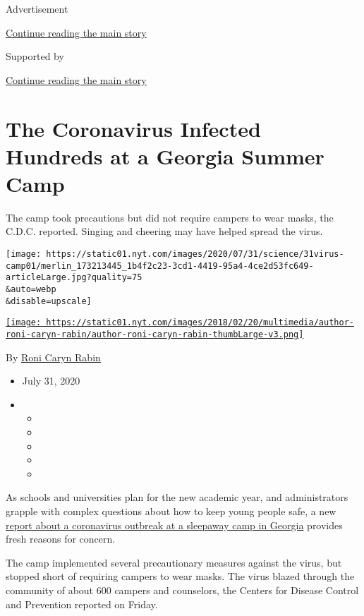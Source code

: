 Advertisement

\protect\hyperlink{after-top}{Continue reading the main story}

Supported by

\protect\hyperlink{after-sponsor}{Continue reading the main story}

\hypertarget{the-coronavirus-infected-hundreds-at-a-georgia-summer-camp}{%
\section{The Coronavirus Infected Hundreds at a Georgia Summer
Camp}\label{the-coronavirus-infected-hundreds-at-a-georgia-summer-camp}}

The camp took precautions but did not require campers to wear masks, the
C.D.C. reported. Singing and cheering may have helped spread the virus.

\texttt{[image: https://static01.nyt.com/images/2020/07/31/science/31virus-camp01/merlin\_173213445\_1b4f2c23-3cd1-4419-95a4-4ce2d53fc649-articleLarge.jpg?quality=75\\\&auto=webp\\\&disable=upscale]}

\href{https://www.nytimes.com/by/roni-caryn-rabin}{\texttt{[image: https://static01.nyt.com/images/2018/02/20/multimedia/author-roni-caryn-rabin/author-roni-caryn-rabin-thumbLarge-v3.png]}}

By \href{https://www.nytimes.com/by/roni-caryn-rabin}{Roni Caryn Rabin}

\begin{itemize}
\item
  July 31, 2020
\item
  \begin{itemize}
  \item
  \item
  \item
  \item
  \item
  \end{itemize}
\end{itemize}

As schools and universities plan for the new academic year, and
administrators grapple with complex questions about how to keep young
people safe, a new
\href{https://www.cdc.gov/mmwr/volumes/69/wr/mm6931e1.htm?s_cid=mm6931e1_w}{report
about a coronavirus outbreak at a sleepaway camp in Georgia} provides
fresh reasons for concern.

The camp implemented several precautionary measures against the virus,
but stopped short of requiring campers to wear masks. The virus blazed
through the community of about 600 campers and counselors, the Centers
for Disease Control and Prevention reported on Friday.

